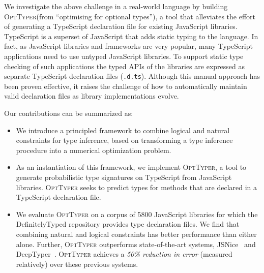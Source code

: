 \documentclass[sigplan,10pt,review,anonymous]{acmart} %
\newcommand{\projectname}{\textsc{OptTyper}\xspace}
\theoremstyle{plain}
\theoremstyle{remark}
\theoremstyle{definition}
\begin{document}
We investigate the above challenge in a real-world language by building
\projectname (from ``optimising for optional types''),
a tool that alleviates the effort of generating a
TypeScript declaration file for existing JavaScript libraries.
TypeScript is a superset of JavaScript that adds static typing to the language.
In fact, as JavaScript libraries and frameworks are very popular, many
TypeScript applications need to use untyped JavaScript libraries.
To support static type
checking of such applications the typed
APIs of the libraries are expressed as separate TypeScript
declaration files (\lstinline{.d.ts}).  Although this manual approach has been proven
effective, it raises the challenge of how to automatically maintain valid declaration files
as library implementations evolve.

Our contributions can be summarized as:
\begin{itemize}[label=\raisebox{0.25ex}{\tiny$\bullet$}]
	\item We introduce a principled framework to combine logical and natural constraints for type inference,
	      based on transforming a type inference procedure into a numerical optimization problem.
	\item As an instantiation of this framework, we implement \projectname, a tool to generate probabilistic type
	      signatures on TypeScript from JavaScript libraries.
	      \projectname seeks to predict types for methods that are declared in a TypeScript declaration file.
	\item We evaluate \projectname on a corpus of 5800 JavaScript libraries for which
	      the DefinitelyTyped repository provides type declaration files.
	      We find that combining natural and logical constraints
	      has better performance than either alone.
	      Further, \projectname outperforms state-of-the-art systems,
	      JSNice~\cite{raychev15} and DeepTyper~\cite{hellendoorn18}.
	      \projectname achieves a \emph{50\% reduction in error} (measured relatively) over these previous systems.
\end{itemize}
\end{document}
